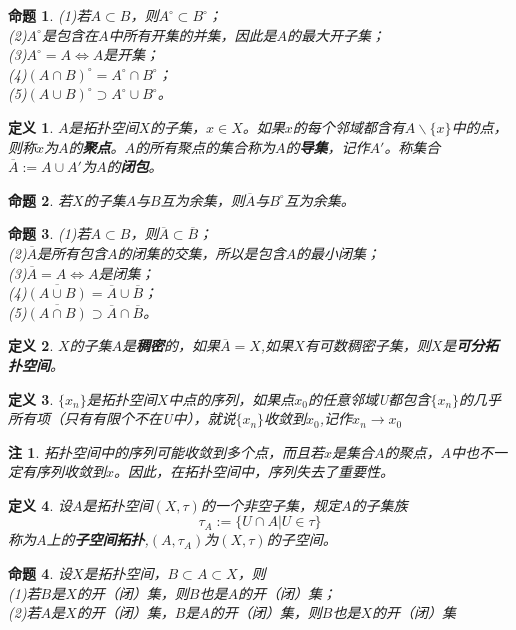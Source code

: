 \documentclass[UTF8]{ctexart}
\newtheorem{dfnt}{定义}
\newtheorem*{note}{注}
\newtheorem{pro}{命题}
\newcommand{\nb}{^\circ}
\begin{document}
\begin{pro}
(1)若$A \subset B$，则$A\nb \subset B\nb$；\\(2)$A\nb$是包含在$A$中所有开集的并集，因此是$A$的最大开子集；\\(3)$A\nb = A \Longleftrightarrow A$是开集；\\(4)$(A \cap B)\nb = A\nb \cap B\nb$；\\(5)$(A \cup B)\nb \supset A\nb \cup B\nb$。
\end{pro}
\begin{dfnt}
$A$是拓扑空间$X$的子集，$x\in X$。如果$x$的每个邻域都含有$A\backslash \{x\}$中的点，则称$x$为$A$的\textbf{聚点}。$A$的所有聚点的集合称为$A$的\textbf{导集}，记作$A'$。称集合$\overline{A}:=A \cup A'$为$A$的\textbf{闭包}。
\end{dfnt}
\begin{pro}
若$X$的子集$A$与$B$互为余集，则$\overline{A}$与$B\nb$互为余集。
\end{pro}
\begin{pro}
(1)若$A \subset B$，则$\overline{A} \subset \overline{B}$；\\
(2)$\overline{A}$是所有包含$A$的闭集的交集，所以是包含$A$的最小闭集；\\(3)$\overline{A} = A \Longleftrightarrow A$是闭集；\\(4)$\overline{(A \cup B)} = \overline{A} \cup \overline{B}$；\\(5)$\overline{(A \cap B)} \supset \overline{A} \cap \overline{B}$。
\end{pro}
\begin{dfnt}
$X$的子集$A$是\textbf{稠密}的，如果$\overline{A} = X$,如果$X$有可数稠密子集，则$X$是\textbf{可分拓扑空间}。
\end{dfnt}
\begin{dfnt}
$\{x_n\}$是拓扑空间$X$中点的序列，如果点$x_0$的任意邻域U都包含$\{x_n\}$的几乎所有项（只有有限个不在U中），就说$\{x_n\}$收敛到$x_0$,记作$x_n \rightarrow x_0$
\end{dfnt}
\begin{note}
拓扑空间中的序列可能收敛到多个点，而且若$x$是集合$A$的聚点，$A$中也不一定有序列收敛到$x$。因此，在拓扑空间中，序列失去了重要性。
\end{note}
\begin{dfnt}
设$A$是拓扑空间$(X,\tau)$的一个非空子集，规定$A$的子集族$$\tau_A := \{U\cap A|U \in \tau\}$$称为$A$上的\textbf{子空间拓扑},$(A,\tau_A)$为$(X,\tau)$的子空间。
\end{dfnt}
\begin{pro}
设$X$是拓扑空间，$B \subset A \subset X$，则\\(1)若$B$是$X$的开（闭）集，则$B$也是$A$的开（闭）集；\\(2)若$A$是$X$的开（闭）集，$B$是$A$的开（闭）集，则$B$也是$X$的开（闭）集
\end{pro}
\end{document}

